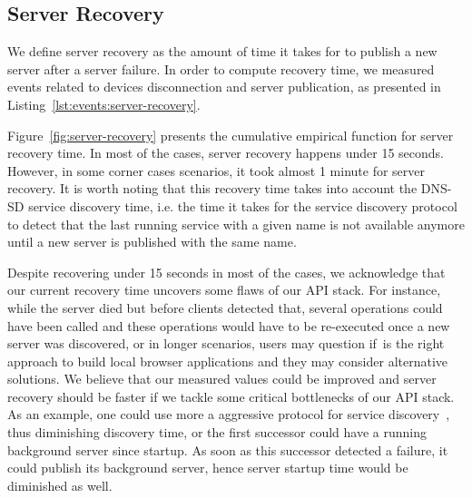 \subsection{Server Recovery}
\label{sub:eval:server-recovery}

We define server recovery as the amount of time it takes for \APIName to publish a new server after a server failure.
In order to compute recovery time, we measured events related to devices disconnection and server publication, as presented
in Listing~\ref{lst:events:server-recovery}. 


Figure~\ref{fig:server-recovery} presents the cumulative empirical function for server recovery time.
In most of the cases, server recovery happens under 15 seconds. 
However, in some corner cases scenarios, it took almost 1 minute for server recovery. 
It is worth noting that this recovery time takes into account the DNS-SD service discovery time, 
i.e. the time it takes for the service discovery protocol to detect that the last running service with a given name is not available anymore until a new server is published with the same name. 


Despite recovering under 15 seconds in most of the cases,
we acknowledge that our current recovery time uncovers some flaws of our API stack.
For instance, while the server died but before clients detected that, several operations could have been called and these operations would have to be re-executed once a new server was discovered, 
or in longer scenarios, users may question if~\APIName is the right approach to build local browser applications and they may consider alternative solutions.
We believe that our measured values could be improved and server recovery should be faster if we tackle some critical bottlenecks of our API stack.
As an example, one could use more a aggressive protocol for service discovery~\cite{hong2007accelerating}, 
thus diminishing discovery time, or the first successor could have a running background server since startup.
As soon as this successor detected a failure, it could publish its background server, 
hence server startup time would be diminished as well. 


